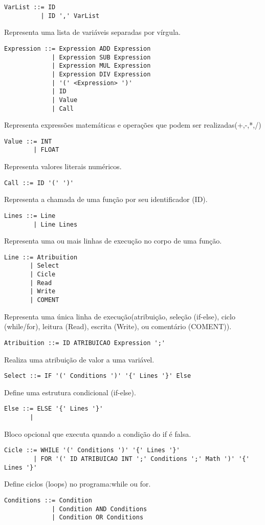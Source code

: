 \documentclass[12pt,a4paper]{report}
\begin{document}
\begin{lstlisting}
VarList ::= ID
          | ID ',' VarList 
\end{lstlisting}
Representa uma lista de variáveis separadas por vírgula.
\begin{lstlisting}
Expression ::= Expression ADD Expression
             | Expression SUB Expression
             | Expression MUL Expression
             | Expression DIV Expression
             | '(' <Expression> ')'
             | ID
             | Value
             | Call
\end{lstlisting}
Representa expressões matemáticas e operações que podem ser realizadas(+,-,*,/)
\begin{lstlisting}
Value ::= INT
        | FLOAT
\end{lstlisting}
Representa valores literais numéricos.
\begin{lstlisting}
Call ::= ID '(' ')'
\end{lstlisting}
Representa a chamada de uma função por seu identificador (ID).
\begin{lstlisting}
Lines ::= Line
        | Line Lines
\end{lstlisting}
Representa uma ou mais linhas de execução no corpo de uma função.
\begin{lstlisting}
Line ::= Atribuition
       | Select
       | Cicle
       | Read
       | Write
       | COMENT
\end{lstlisting}
Representa uma única linha de execução(atribuição, seleção (if-else), ciclo (while/for), leitura (Read), escrita (Write), ou comentário (COMENT)).
\begin{lstlisting}
Atribuition ::= ID ATRIBUICAO Expression ';'
\end{lstlisting}
Realiza uma atribuição de valor a uma variável.
\begin{lstlisting}
Select ::= IF '(' Conditions ')' '{' Lines '}' Else
\end{lstlisting}
Define uma estrutura condicional (if-else).
\begin{lstlisting}
Else ::= ELSE '{' Lines '}'
       |
\end{lstlisting}
Bloco opcional que executa quando a condição do if é falsa.
\begin{lstlisting}
Cicle ::= WHILE '(' Conditions ')' '{' Lines '}'
        | FOR '(' ID ATRIBUICAO INT ';' Conditions ';' Math ')' '{' Lines '}'
\end{lstlisting}
Define ciclos (loops) no programa:while ou for.
\begin{lstlisting}
Conditions ::= Condition
             | Condition AND Conditions
             | Condition OR Conditions
\end{lstlisting}
\end{document}
